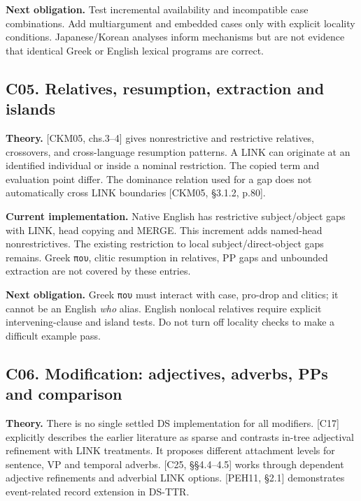 \documentclass[11pt,a4paper]{article}
\begin{document}
\textbf{Next obligation.} Test incremental availability and incompatible
case combinations. Add multiargument and embedded cases only with
explicit locality conditions. Japanese/Korean analyses inform mechanisms
but are not evidence that identical Greek or English lexical programs
are correct.

\subsection{C05. Relatives, resumption, extraction and
islands}\label{c05.-relatives-resumption-extraction-and-islands}

\textbf{Theory.} {[}CKM05, chs.3--4{]} gives nonrestrictive and
restrictive relatives, crossovers, and cross-language resumption
patterns. A LINK can originate at an identified individual or inside a
nominal restriction. The copied term and evaluation point differ. The
dominance relation used for a gap does not automatically cross LINK
boundaries {[}CKM05, §3.1.2, p.80{]}.

\textbf{Current implementation.} Native English has restrictive
subject/object gaps with LINK, head copying and MERGE. This increment
adds named-head nonrestrictives. The existing restriction to local
subject/direct-object gaps remains. Greek \texttt{που}, clitic
resumption in relatives, PP gaps and unbounded extraction are not
covered by these entries.

\textbf{Next obligation.} Greek \texttt{που} must interact with case,
pro-drop and clitics; it cannot be an English \emph{who} alias. English
nonlocal relatives require explicit intervening-clause and island tests.
Do not turn off locality checks to make a difficult example pass.

\subsection{C06. Modification: adjectives, adverbs, PPs and
comparison}\label{c06.-modification-adjectives-adverbs-pps-and-comparison}

\textbf{Theory.} There is no single settled DS implementation for all
modifiers. {[}C17{]} explicitly describes the earlier literature as
sparse and contrasts in-tree adjectival refinement with LINK treatments.
It proposes different attachment levels for sentence, VP and temporal
adverbs. {[}C25, §§4.4--4.5{]} works through dependent adjective
refinements and adverbial LINK options. {[}PEH11, §2.1{]} demonstrates
event-related record extension in DS-TTR.
\end{document}
